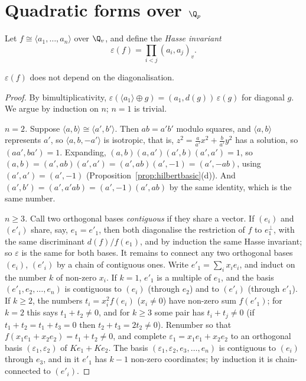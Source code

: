 \section{Quadratic forms over $\Q_p$}

Let $f\cong\langle a_1,\dots,a_n\rangle$ over $\Q_v$, and define the \emph{Hasse invariant}
\[
\varepsilon(f)=\prod_{i<j}(a_i,a_j)_v.
\]

\begin{proposition}\label{prop:hasseinv}
$\varepsilon(f)$ does not depend on the diagonalisation.
\end{proposition}
\begin{proof}
By bimultiplicativity, $\varepsilon(\langle a_1\rangle\oplus g)=(a_1,d(g))\,\varepsilon(g)$ for diagonal $g$. We argue by induction on
$n$; $n=1$ is trivial.

\emph{$n=2$.} Suppose $\langle a,b\rangle\cong\langle a',b'\rangle$. Then $ab=a'b'$ modulo squares, and $\langle a,b\rangle$
represents $a'$, so $\langle a,b,-a'\rangle$ is isotropic, that is, $z^2=\frac a{a'}x^2+\frac b{a'}y^2$ has a solution, so
$(aa',ba')=1$. Expanding, $(a,b)(a,a')(a',b)(a',a')=1$, so $(a,b)=(a',ab)(a',a')=(a',ab)(a',-1)=(a',-ab)$, using $(a',a')=(a',-1)$
(Proposition~\ref{prop:hilbertbasic}(d)). And $(a',b')=(a',a'ab)=(a',-1)(a',ab)$ by the same identity, which is the same number.

\emph{$n\ge3$.} Call two orthogonal bases \emph{contiguous} if they share a vector. If $(e_i)$ and $(e'_i)$ share, say,
$e_1=e'_1$, then both diagonalise the restriction of $f$ to $e_1^\perp$, with the same discriminant $d(f)/f(e_1)$, and by
induction the same Hasse invariant; so $\varepsilon$ is the same for both bases. It remains to connect any two orthogonal bases
$(e_i)$, $(e'_i)$ by a chain of contiguous ones. Write $e'_1=\sum_ix_ie_i$, and induct on the number $k$ of non-zero $x_i$. If
$k=1$, $e'_1$ is a multiple of $e_1$, and the basis $(e'_1,e_2,\dots,e_n)$ is contiguous to $(e_i)$ (through $e_2$) and to
$(e'_i)$ (through $e'_1$). If $k\ge2$, the numbers $t_i=x_i^2f(e_i)$ ($x_i\ne0$) have non-zero sum $f(e'_1)$; for $k=2$ this
says $t_1+t_2\ne0$, and for $k\ge3$ some pair has $t_i+t_j\ne0$ (if $t_1+t_2=t_1+t_3=0$ then $t_2+t_3=2t_2\ne0$). Renumber so
that $f(x_1e_1+x_2e_2)=t_1+t_2\ne0$, and complete $\varepsilon_1=x_1e_1+x_2e_2$ to an orthogonal basis $(\varepsilon_1,\varepsilon_2)$
of $Ke_1+Ke_2$. The basis $(\varepsilon_1,\varepsilon_2,e_3,\dots,e_n)$ is contiguous to $(e_i)$ through $e_3$, and in it $e'_1$ has
$k-1$ non-zero coordinates; by induction it is chain-connected to $(e'_i)$.
\end{proof}

